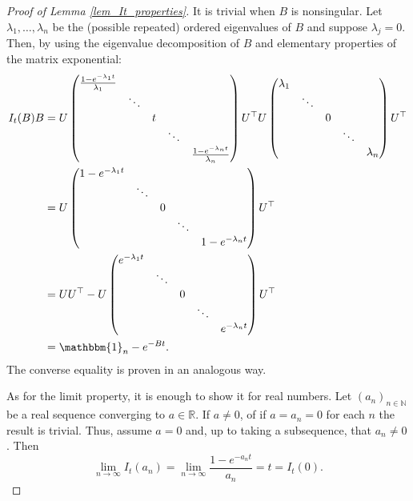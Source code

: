 \documentclass{article}
\theoremstyle{definition}
\theoremstyle{remark}
\numberwithin{equation}{section}
\newcommand{\R}{\mathbb{R}}
\newcommand{\N}{\mathbb{N}}
\begin{document}
\begin{proof}[Proof of Lemma \ref{lem_It_properties}]

    It is trivial when $B$ is nonsingular.
    Let $\lambda_1, \ldots, \lambda_n$ be the (possible repeated) ordered eigenvalues of $B$ and suppose $\lambda_j = 0$. Then, by using the eigenvalue decomposition of $B$ and elementary properties of the matrix exponential:
    \begin{align}
        I_t(B)B &= U \begin{pmatrix}
            \frac{1 - e^{-\lambda_1t}}{\lambda_1} & & & & \\
            & \ddots & & & \\
            & & t & & \\
            & & & \ddots & \\
            & & & & \frac{1 - e^{-\lambda_nt}}{\lambda_n} 
        \end{pmatrix} U^\top  U \begin{pmatrix}
            \lambda_1 & & & & \\
            & \ddots & & & \\
            & & 0 & & \\
            & & & \ddots & \\
            & & & & \lambda_n 
        \end{pmatrix} U^\top  \\
        &= U \begin{pmatrix}
            1 - e^{-\lambda_1t} & & & & \\
            & \ddots & & & \\
            & & 0 & & \\
            & & & \ddots & \\
            & & & & 1 - e^{-\lambda_nt}
        \end{pmatrix} U^\top  \\
        &= UU^\top - U \begin{pmatrix}
            e^{-\lambda_1t} & & & & \\
            & \ddots & & & \\
            & & 0 & & \\
            & & & \ddots & \\
            & & & & e^{-\lambda_nt}
        \end{pmatrix} U^\top  \\
        &= \mathbbm{1}_n - e^{-Bt}.
    \end{align}
    The converse equality is proven in an analogous way.

    As for the limit property, it is enough to show it for real numbers.
    Let $(a_n)_{n\in\N}$ be a real sequence converging to $a\in \R$.
    If $a\ne 0$, of if $a = a_n = 0$ for each $n$ the result is trivial.
    Thus, assume $a=0$ and, up to taking a subsequence, that $a_n\ne 0$.
    Then
    \[
        \lim_{n\to \infty}I_t(a_n) =\lim_{n\to \infty}\frac{1-e^{-a_nt}}{a_n} = t = I_t(0).
    \]
\end{proof}
\end{document}
